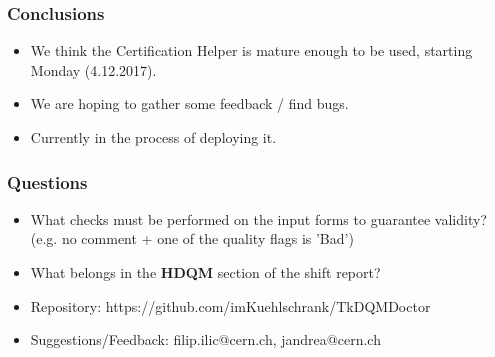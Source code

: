 \documentclass{beamer}
\begin{document}
\begin{frame}
  \frametitle{Conclusions}
  \begin{itemize}
  \item We think the Certification Helper is mature enough to be used, starting Monday (4.12.2017).
  \item We are hoping to gather some feedback / find bugs.
  \item Currently in the process of deploying it.
  \end{itemize}
\end{frame}

\begin{frame}
  \frametitle{Questions}
  \begin{itemize}
    \item What checks must be performed on the input forms to guarantee validity?\\(e.g. no comment + one of the quality flags is 'Bad')
    \item What belongs in the \textbf{HDQM} section of the shift report? 
  \end{itemize}
\end{frame}


\begin{frame}
\begin{itemize}
\item Repository: https://github.com/imKuehlschrank/TkDQMDoctor
\item Suggestions/Feedback: filip.ilic@cern.ch, jandrea@cern.ch
\end{itemize}
\end{frame}
\end{document}
